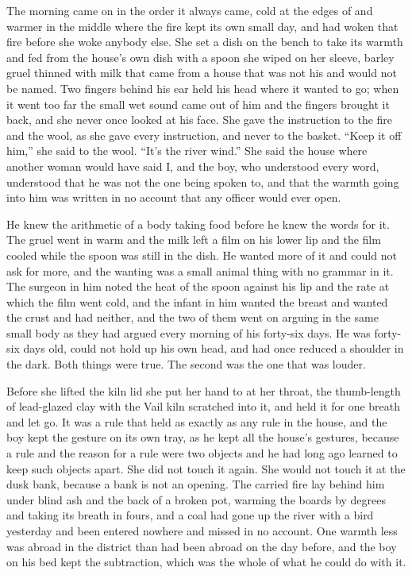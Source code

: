 
The morning came on in the order it always came, cold at the edges of  and warmer in the middle where the fire kept its own small day, and  had woken that fire before she woke anybody else. She set a dish on the bench to take its warmth and fed  from the house's own dish with a spoon she wiped on her sleeve, barley gruel thinned with milk that came from a house that was not his and would not be named. Two fingers behind his ear held his head where it wanted to go; when it went too far the small wet sound came out of him and the fingers brought it back, and she never once looked at his face. She gave the instruction to the fire and the wool, as she gave every instruction, and never to the basket. “Keep it off him,” she said to the wool. “It's the river wind.” She said the house where another woman would have said I, and the boy, who understood every word, understood that he was not the one being spoken to, and that the warmth going into him was written in no account that any officer would ever open.

He knew the arithmetic of a body taking food before he knew the words for it. The gruel went in warm and the milk left a film on his lower lip and the film cooled while the spoon was still in the dish. He wanted more of it and could not ask for more, and the wanting was a small animal thing with no grammar in it. The surgeon in him noted the heat of the spoon against his lip and the rate at which the film went cold, and the infant in him wanted the breast and wanted the crust and had neither, and the two of them went on arguing in the same small body as they had argued every morning of his forty-six days. He was forty-six days old, could not hold up his own head, and had once reduced a shoulder in the dark. Both things were true. The second was the one that was louder.

Before she lifted the kiln lid she put her hand to  at her throat, the thumb-length of lead-glazed clay with the Vail kiln scratched into it, and held it for one breath and let go. It was a rule that held as exactly as any rule in the house, and the boy kept the gesture on its own tray, as he kept all the house's gestures, because a rule and the reason for a rule were two objects and he had long ago learned to keep such objects apart. She did not touch it again. She would not touch it at the dusk bank, because a bank is not an opening. The carried fire lay behind him under blind ash and the back of a broken pot, warming the boards by degrees and taking its breath in fours, and a coal had gone up the river with a bird yesterday and been entered nowhere and missed in no account. One warmth less was abroad in the district than had been abroad on the day before, and the boy on his bed kept the subtraction, which was the whole of what he could do with it.

